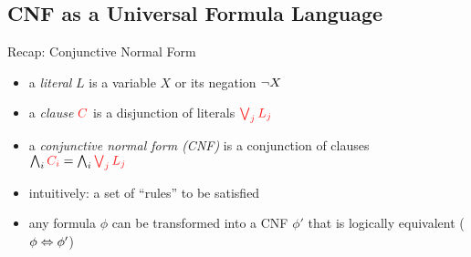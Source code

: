 \subsection{CNF as a Universal Formula Language}

\begin{frame}{\myframetitle} %
	\begin{mycolumns}[animation=none]
		\begin{definition}{Recap: Conjunctive Normal Form}
			\begin{itemize}
				\item a \emph{literal} $L$ is a variable $X$ or its negation $\neg X$
				\item a \emph{clause} $\clause{C}$ is a disjunction of literals $\clause{\bigvee_{j} L_j}$
				\item a \emph{conjunctive normal form (CNF)} is a conjunction of clauses $\bigwedge_{i} \clause{C_i} = \bigwedge_{i} \clause{\bigvee_{j} L_j}$
				\item intuitively: a set of ``rules'' to be satisfied
				\item any formula $\phi$ can be transformed into a CNF $\phi'$ that is logically equivalent ($\phi \Leftrightarrow \phi'$)
			\end{itemize}
		\end{definition}
	\mynextcolumn
\end{mycolumns}
\end{frame}

